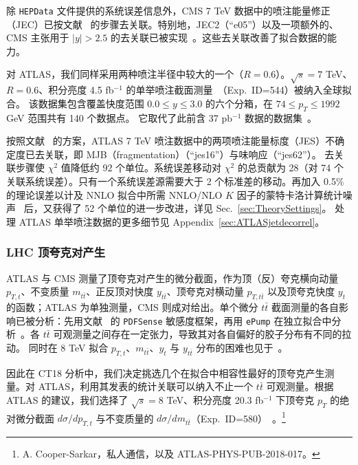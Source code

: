 除 \texttt{HEPData} 文件提供的系统误差信息外，CMS 7 TeV 数据中的喷注能量修正（JEC）已按文献~\cite{Khachatryan:2014waa} 的步骤去关联。特别地，JEC2（``e05''）以及一项额外的、CMS 主张用于 $|y|>2.5$ 的去关联已被实现~\cite{Voutilainen}。这些去关联改善了拟合数据的能力。

对 ATLAS，我们同样采用两种喷注半径中较大的一个（$R=0.6$）。$\sqrt{s}=7$ TeV、$R=0.6$、积分亮度 4.5 fb$^{-1}$ 的单举喷注截面测量~\cite{Aad:2014vwa}（Exp.~ID=544）被纳入全球拟合。
该数据集包含覆盖快度范围 $0.0 \leq y \leq 3.0$ 的六个分箱，在 $74\leq p_T\leq 1992$ GeV 范围共有 140 个数据点。
它取代了此前含 37 pb$^{-1}$ 数据的数据集~\cite{Aad:2011fc}。

按照文献~\cite{Aaboud:2017dvo} 的方案，ATLAS 7 TeV 喷注数据中的两项喷注能量标度（JES）不确定度已去关联，即 MJB（fragmentation）（``jes16''）与味响应（``jes62''）。
去关联步骤使 $\chi^2$ 值降低约 92 个单位。系统误差移动对 $\chi^2$ 的总贡献为 28（对 74 个关联系统误差）。只有一个系统误差源需要大于 2 个标准差的移动。再加入 0.5\% 的理论误差以计及 NNLO 拟合中所需 NNLO/NLO $K$ 因子的蒙特卡洛计算统计噪声~\cite{Currie:2016bfm,Currie:2017ctp,Currie:2018xkj} 后，又获得了 52 个单位的进一步改进，详见 Sec.~\ref{sec:TheorySettings}。
处理 ATLAS 单举喷注数据的更多细节见 Appendix~\ref{sec:ATLASjetdecorrel}。

\subsubsection{LHC 顶夸克对产生}
\label{sec:DataTop}

ATLAS 与 CMS 测量了顶夸克对产生的微分截面，作为顶（反）夸克横向动量 $p_{T,t}$、不变质量 $m_{t\bar{t}}$、正反顶对快度 $y_{t\bar{t}}$、顶夸克对横动量 $p_{T, t\bar{t}}$ 以及顶夸克快度 $y_t$ 的函数；ATLAS 为单独测量，CMS 则成对给出。单个微分 $t\bar{t}$ 截面测量的各自影响已被分析：先用文献~\cite{Wang:2018heo} 的 \texttt{PDFSense} 敏感度框架，再用 \texttt{ePump} 在独立拟合中分析~\cite{Hou:2019gfw,Hou:2019jxd}。各 $t\bar t$ 可观测量之间存在一定张力，导致其对各自偏好的胶子分布有不同的拉动。
同时在 8 TeV 拟合 $p_{T,t}$、$m_{t\bar{t}}$、$y_{t}$ 与 $y_{t\bar{t}}$ 分布的困难也见于~\cite{Bailey:2019yze,Hou:2019gfw,Hou:2019jxd}。

因此在 CT18 分析中，我们决定挑选几个在拟合中相容性最好的顶夸克产生测量。对 ATLAS，利用其发表的统计关联可以纳入不止一个 $t\bar t$ 可观测量。根据 ATLAS 的建议，我们选择了 $\sqrt{s}=8$ TeV、积分亮度 20.3 fb$^{-1}$ 下顶夸克 $p_T$ 的绝对微分截面 $d\sigma/dp_{T,t}$ 与不变质量的 $d\sigma/dm_{t\bar{t}}$（Exp.~ID=580）~\cite{Aad:2015mbv}。\footnote{A. Cooper-Sarkar，私人通信，以及 ATLAS-PHYS-PUB-2018-017。}

